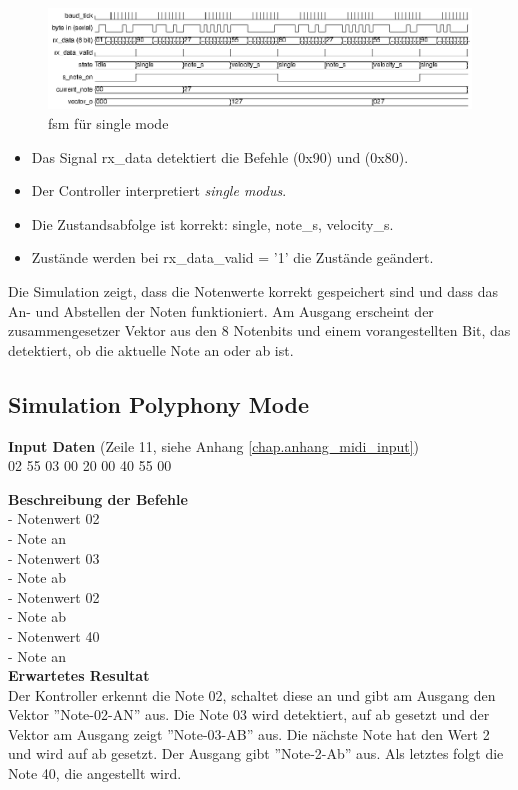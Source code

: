 \newpage

\begin{figure}[H]
	\centering
	\includegraphics[width=1\textwidth]{images/midi_control/wave_single.png}
	\caption{fsm für single mode}
	\label{fig.midicontrol_singlet}
\end{figure}

\begin{itemize}
	\item Das Signal rx\_data detektiert die Befehle (0x90) und (0x80).
	\item Der Controller interpretiert  \textit{single modus}. 
	\item Die Zustandsabfolge ist korrekt: single, note\_s, velocity\_s.
	\item Zustände werden bei rx\_data\_valid = '1' die Zustände geändert.
\end{itemize}

Die Simulation zeigt, dass die Notenwerte korrekt gespeichert sind und dass das An- und Abstellen der Noten funktioniert. Am Ausgang erscheint der zusammengesetzer Vektor aus den 8 Notenbits und einem vorangestellten Bit, das detektiert, ob die aktuelle Note an oder ab ist. 



\subsection{Simulation Polyphony Mode}
\textbf{Input Daten} (Zeile 11, siehe Anhang \ref{chap.anhang_midi_input})\\
02 55 03 00 20 00 40 55 00

\textbf{Beschreibung der Befehle}\\
- Notenwert 02\\
- Note an\\
- Notenwert 03\\
- Note ab\\
- Notenwert 02\\
- Note ab\\
- Notenwert 40\\
- Note an\\

\textbf{Erwartetes Resultat}\\
Der Kontroller erkennt die Note 02, schaltet diese an und gibt am Ausgang den Vektor ''Note-02-AN'' aus. Die Note 03 wird detektiert, auf ab gesetzt und der Vektor am Ausgang zeigt ''Note-03-AB'' aus. Die nächste Note hat den Wert 2 und wird auf ab gesetzt. Der Ausgang gibt ''Note-2-Ab'' aus. Als letztes folgt die Note 40, die angestellt wird.\\

